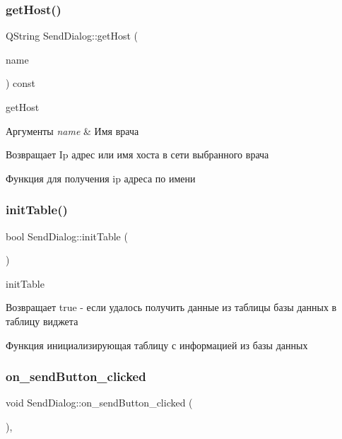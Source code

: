 \subsubsection{\texorpdfstring{get\+Host()}{getHost()}}
{\footnotesize\ttfamily Q\+String Send\+Dialog\+::get\+Host (\begin{DoxyParamCaption}\item[{const Q\+String \&}]{name }\end{DoxyParamCaption}) const\hspace{0.3cm}{\ttfamily [private]}}



get\+Host 


\begin{DoxyParams}{Аргументы}
{\em name} & Имя врача \\
\hline
\end{DoxyParams}
\begin{DoxyReturn}{Возвращает}
Ip адрес или имя хоста в сети выбранного врача
\end{DoxyReturn}
Функция для получения ip адреса по имени \mbox{\label{classSendDialog_a479b0de26c1b97fa47ffcbd67252da1f}} 
\subsubsection{\texorpdfstring{init\+Table()}{initTable()}}
{\footnotesize\ttfamily bool Send\+Dialog\+::init\+Table (\begin{DoxyParamCaption}{ }\end{DoxyParamCaption})\hspace{0.3cm}{\ttfamily [private]}}



init\+Table 

\begin{DoxyReturn}{Возвращает}
true -\/ если удалось получить данные из таблицы базы данных в таблицу виджета
\end{DoxyReturn}
Функция инициализирующая таблицу с информацией из базы данных \mbox{\label{classSendDialog_a542483b8bf0dd1230e060e217d58d468}} 
\subsubsection{\texorpdfstring{on\+\_\+send\+Button\+\_\+clicked}{on\_sendButton\_clicked}}
{\footnotesize\ttfamily void Send\+Dialog\+::on\+\_\+send\+Button\+\_\+clicked (\begin{DoxyParamCaption}{ }\end{DoxyParamCaption})\hspace{0.3cm}{\ttfamily [private]}, {\ttfamily [slot]}}



